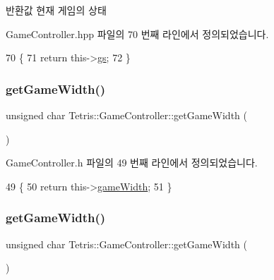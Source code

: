 \begin{DoxyReturn}{반환값}
현재 게임의 상태 
\end{DoxyReturn}


Game\+Controller.\+hpp 파일의 70 번째 라인에서 정의되었습니다.


\begin{DoxyCode}
70                                       \{
71                 \textcolor{keywordflow}{return} this->\hyperlink{class_tetris_1_1_game_controller_ae4c894005a82404c73a5a9a6efb208dc}{gs};
72             \}
\end{DoxyCode}
\mbox{\label{class_tetris_1_1_game_controller_a256cff75224efe165e1c5409c69b0503}} 
\subsubsection{\texorpdfstring{get\+Game\+Width()}{getGameWidth()}\hspace{0.1cm}{\footnotesize\ttfamily [1/2]}}
{\footnotesize\ttfamily unsigned char Tetris\+::\+Game\+Controller\+::get\+Game\+Width (\begin{DoxyParamCaption}{ }\end{DoxyParamCaption})\hspace{0.3cm}{\ttfamily [inline]}}



Game\+Controller.\+h 파일의 49 번째 라인에서 정의되었습니다.


\begin{DoxyCode}
49                                     \{
50             \textcolor{keywordflow}{return} this->\hyperlink{class_tetris_1_1_game_controller_a439f215918db4127fcb44cf9d501ed63}{gameWidth};
51         \}
\end{DoxyCode}
\mbox{\label{class_tetris_1_1_game_controller_a256cff75224efe165e1c5409c69b0503}} 
\subsubsection{\texorpdfstring{get\+Game\+Width()}{getGameWidth()}\hspace{0.1cm}{\footnotesize\ttfamily [2/2]}}
{\footnotesize\ttfamily unsigned char Tetris\+::\+Game\+Controller\+::get\+Game\+Width (\begin{DoxyParamCaption}{ }\end{DoxyParamCaption})\hspace{0.3cm}{\ttfamily [inline]}}



